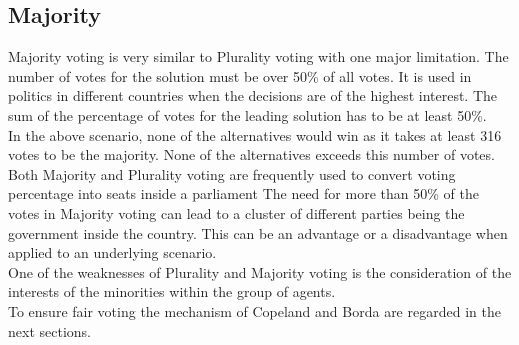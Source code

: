 \documentclass[german, a4paper, 11pt, oneside]{scrbook}
\begin{document}
\subsection{Majority}
Majority voting is very similar to Plurality voting with one major limitation. The number of votes for the solution must be over 50\% of all votes. It is used in politics in different countries when the decisions are of the highest interest. The sum of the percentage of votes for the leading solution has to be at least 50\%.\\  In the above scenario, none of the alternatives would win as it takes at least 316 votes to be the majority. None of the alternatives exceeds this number of votes. \\Both Majority and Plurality voting are frequently used to convert voting percentage into seats inside a parliament \cite{Blais.1988} The need for more than 50\% of the votes in Majority voting can lead to a cluster of different parties being the government inside the country. This can be an advantage or a disadvantage when applied to an underlying scenario. \\One of the weaknesses of Plurality and Majority voting is the consideration of the interests of the minorities within the group of agents. \\To ensure fair voting the mechanism of Copeland and Borda are regarded in the next sections.
\end{document}
